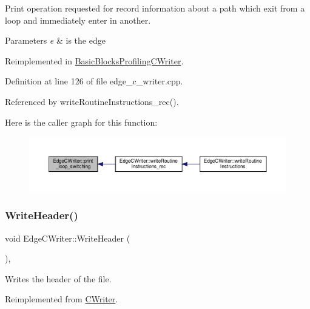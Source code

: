 Print operation requested for record information about a path which exit from a loop and immediately enter in another. 


\begin{DoxyParams}{Parameters}
{\em e} & is the edge \\
\hline
\end{DoxyParams}


Reimplemented in \hyperlink{classBasicBlocksProfilingCWriter_abf73db4344fbaf917e5133dfa9699d27}{Basic\+Blocks\+Profiling\+C\+Writer}.



Definition at line 126 of file edge\+\_\+c\+\_\+writer.\+cpp.



Referenced by write\+Routine\+Instructions\+\_\+rec().

Here is the caller graph for this function\+:
\nopagebreak
\begin{figure}[H]
\begin{center}
\leavevmode
\includegraphics[width=350pt]{d7/dee/classEdgeCWriter_a38bd255fe79b665fb52cf5bf566255ce_icgraph}
\end{center}
\end{figure}
\mbox{\label{classEdgeCWriter_a8b053256b8c65aca7d7539ebd23537c8}} 
\subsubsection{\texorpdfstring{Write\+Header()}{WriteHeader()}}
{\footnotesize\ttfamily void Edge\+C\+Writer\+::\+Write\+Header (\begin{DoxyParamCaption}{ }\end{DoxyParamCaption})\hspace{0.3cm}{\ttfamily [override]}, {\ttfamily [virtual]}}



Writes the header of the file. 



Reimplemented from \hyperlink{classCWriter_a04b8381e64ef2e49ec7cfc308e10e10a}{C\+Writer}.



